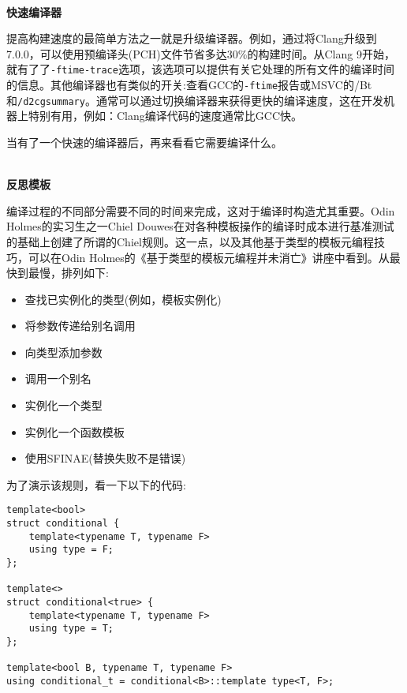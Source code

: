 \hspace*{\fill} \\ %
\noindent
\textbf{快速编译器}

提高构建速度的最简单方法之一就是升级编译器。例如，通过将Clang升级到7.0.0，可以使用预编译头(PCH)文件节省多达30\%的构建时间。从Clang 9开始，就有了了\texttt{-ftime-trace}选项，该选项可以提供有关它处理的所有文件的编译时间的信息。其他编译器也有类似的开关:查看GCC的\texttt{-ftime}报告或MSVC的/Bt和\texttt{/d2cgsummary}。通常可以通过切换编译器来获得更快的编译速度，这在开发机器上特别有用，例如：Clang编译代码的速度通常比GCC快。

当有了一个快速的编译器后，再来看看它需要编译什么。

\hspace*{\fill} \\ %
\noindent
\textbf{反思模板}

编译过程的不同部分需要不同的时间来完成，这对于编译时构造尤其重要。Odin Holmes的实习生之一Chiel Douwes在对各种模板操作的编译时成本进行基准测试的基础上创建了所谓的Chiel规则。这一点，以及其他基于类型的模板元编程技巧，可以在Odin Holmes的《基于类型的模板元编程并未消亡》讲座中看到。从最快到最慢，排列如下:

\begin{itemize}
\item 
查找已实例化的类型(例如，模板实例化)

\item 
将参数传递给别名调用

\item 
向类型添加参数

\item 
调用一个别名

\item 
实例化一个类型

\item 
实例化一个函数模板

\item 
使用SFINAE(替换失败不是错误)
\end{itemize}

为了演示该规则，看一下以下的代码:

\begin{lstlisting}[style=styleCXX]
template<bool>
struct conditional {
	template<typename T, typename F>
	using type = F;
};

template<>
struct conditional<true> {
	template<typename T, typename F>
	using type = T;
};

template<bool B, typename T, typename F>
using conditional_t = conditional<B>::template type<T, F>;
\end{lstlisting}

